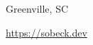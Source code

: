 \documentclass{moderncv}
\begin{document}
	
	\makecvtitle
	Greenville, SC
	
	\url{https://sobeck.dev}

	\noindent\makebox[\linewidth]{\rule{\paperwidth}{0.4pt}}
\end{document}
